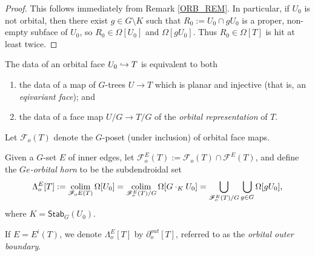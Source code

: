 \documentclass[a4paper,10pt,draft]{article}%
\begin{document}
\begin{proof}
      This follows immediately from Remark \ref{ORB_REM}.
      In particular, 
      if $U_0$ is not orbital, then there exist $g \in G \setminus K$ such that
      $R_0 := U_0 \cap g U_0$ is a proper, non-empty subface of $U_0$, so $R_0 \in \Omega[U_0]$ and $\Omega[g U_0]$.
      Thus $R_0 \in \Omega[T]$ is hit at least twice.
\end{proof}

\begin{remark}
      \label{ORB_FACE_REM}
      The data of an orbital face $U_0 \hookrightarrow T$ is equivalent to both
      \begin{enumerate}
      \item the data of a map of $G$-trees $U \to T$ which is planar and injective
            (that is, an \textit{eqivariant face}); and
      \item the data of a face map $U/G \to T/G$ of the \textit{orbital representation} of $T$.
      \end{enumerate}
\end{remark}

\begin{definition}
      Let $\mathscr{F}_{o}(T)$ denote the $G$-poset (under inclusion) of orbital face maps.
      
      Given a $G$-set $E$ of inner edges, let
      $\mathscr{F}_{o}^{E}(T) := \mathscr{F}_{o}(T) \cap \mathscr{F}^E(T)$,
      and define the \textit{$Ge$-orbital horn} to be the subdendroidal set
      \begin{equation}
            \Lambda^{E}_{o}[T] :=
            \mathop{\operatorname{colim}}\limits_{\mathscr{F}_o{E}(T)}\Omega[U_0]
            = \mathop{\operatorname{colim}}\limits_{\mathscr{F}_{o}^{E}(T)/G}\Omega[G\cdot_K U_0]
            = \mathop{\bigcup}\limits_{\mathscr{F}_o^{E}(T)/G} \mathop{\bigcup}\limits_{g \in G}\Omega[g U_0], 
      \end{equation}
      where $K = \mathsf{Stab}_G(U_0)$.

      If $E = E^i(T)$, we denote $\Lambda^{E}_o[T]$ by $\partial^{out}_o[T]$,
      referred to as the \textit{orbital outer boundary}.      
\end{definition}
\end{document}

